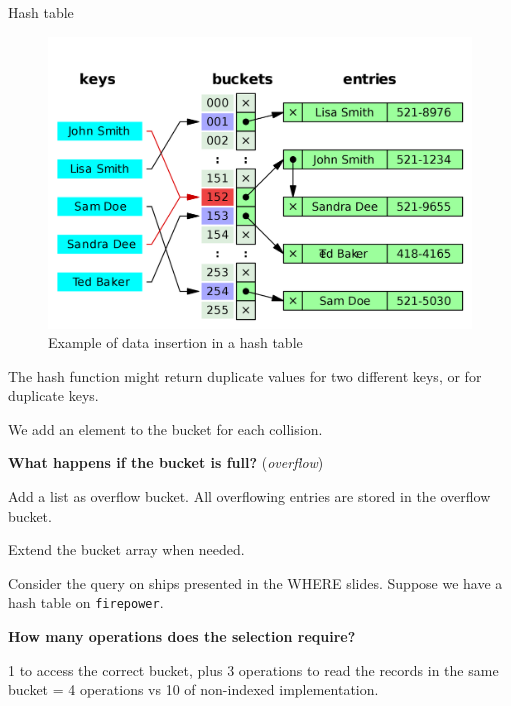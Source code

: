 \documentclass{beamer}
\begin{document}
\begin{frame}{Hash table}
\begin{figure}
\centering
\includegraphics[scale=0.10]{img/hash_table}
\caption{Example of data insertion in a hash table}
\end{figure}
\end{frame}

\begin{slide}{
\item The hash function might return duplicate values for two different keys, or for duplicate keys.
\item We add an element to the bucket for each collision.
\item \textbf{What happens if the bucket is full?} (\textit{overflow})
\pause
\item Add a list as overflow bucket. All overflowing entries are stored in the overflow bucket.
\item Extend the bucket array when needed.
}\end{slide}

\begin{slide}{
\item Consider the query on ships presented in the WHERE slides. Suppose we have a hash table on \texttt{firepower}.
\item \textbf{How many operations does the selection require?}
\pause
\item 1 to access the correct bucket, plus 3 operations to read the records in the same bucket = 4 operations vs 10 of non-indexed implementation.
}\end{slide}
\end{document}
